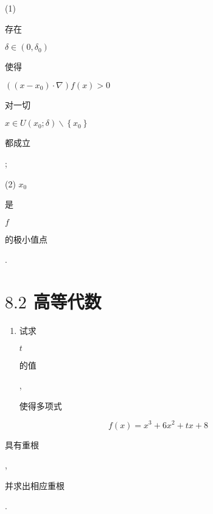 \documentclass[10pt]{article}
\begin{document}
(1) \begin{CJK}{UTF8}{mj}存在\end{CJK} $\delta \in\left(0, \delta_{0}\right)$ \begin{CJK}{UTF8}{mj}使得\end{CJK} $\left(\left(x-x_{0}\right) \cdot \nabla\right) f(x)>0$ \begin{CJK}{UTF8}{mj}对一切\end{CJK} $x \in U\left(x_{0} ; \delta\right) \backslash\left\{x_{0}\right\}$ \begin{CJK}{UTF8}{mj}都成立\end{CJK};

(2) $x_{0}$ \begin{CJK}{UTF8}{mj}是\end{CJK} $f$ \begin{CJK}{UTF8}{mj}的极小值点\end{CJK}.

\section{$8.2$ 高等代数}
\begin{enumerate}
  \item \begin{CJK}{UTF8}{mj}试求\end{CJK} $t$ \begin{CJK}{UTF8}{mj}的值\end{CJK}, \begin{CJK}{UTF8}{mj}使得多项式\end{CJK}
\end{enumerate}
$$
f(x)=x^{3}+6 x^{2}+t x+8
$$
\begin{CJK}{UTF8}{mj}具有重根\end{CJK}, \begin{CJK}{UTF8}{mj}并求出相应重根\end{CJK}.
\end{document}
